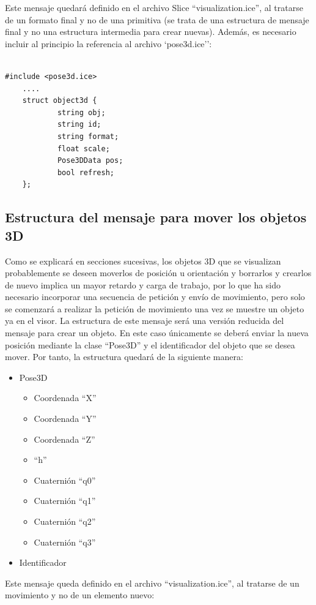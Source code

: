 Este mensaje quedará definido en el archivo Slice ``visualization.ice'', al tratarse de un formato final y no de una primitiva (se trata de una estructura de mensaje final y no una estructura intermedia para crear nuevas). Además, es necesario incluir al principio la referencia al archivo `pose3d.ice'':

\begin{lstlisting}[frame=single]

#include <pose3d.ice>
	....
  	struct object3d {
    		string obj;
    		string id;
    		string format;
    		float scale;
    		Pose3DData pos;
    		bool refresh;
  	};

 \end{lstlisting}


\subsection{Estructura del mensaje para mover los objetos 3D}
Como se explicará en secciones sucesivas, los objetos 3D que se visualizan probablemente se deseen moverlos de posición u orientación y borrarlos y crearlos de nuevo implica un mayor retardo y carga de trabajo, por lo que ha sido necesario incorporar una secuencia de petición y envío de movimiento, pero solo se comenzará a realizar la petición de movimiento una vez se muestre un objeto ya en el visor. La estructura de este mensaje será una versión reducida del mensaje para crear un objeto. En este caso únicamente se deberá enviar la nueva posición mediante la clase ``Pose3D'' y el identificador del objeto que se desea mover. Por tanto, la estructura quedará de la siguiente manera:
\begin{itemize}
	\item	Pose3D
	\begin{itemize}
		\item Coordenada ``X''
		\item Coordenada ``Y''
		\item Coordenada ``Z''
		\item ``h''
		\item Cuaternión ``q0''
		\item Cuaternión ``q1''
		\item Cuaternión ``q2''
		\item Cuaternión ``q3''
	\end{itemize}
	\item Identificador
\end{itemize}

Este mensaje queda definido en el archivo ``visualization.ice'', al tratarse de un movimiento y no de un elemento nuevo:

